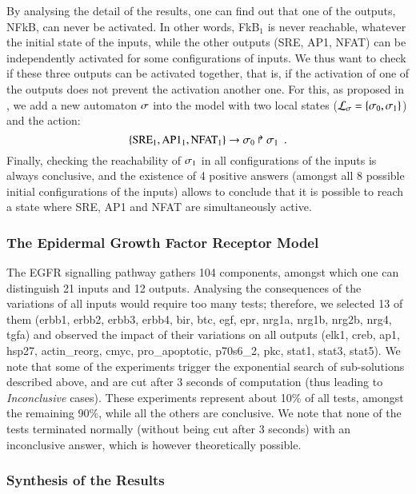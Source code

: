 By analysing the detail of the results, one can find out that one of the outputs, NFkB, can never be activated.
In other words, FkB$_1$ is never reachable, whatever the initial state of the inputs,
while the other outputs (SRE, AP1, NFAT) can be independently activated
for some configurations of inputs.
We thus want to check if these three outputs can be activated together,
that is, if the activation of one of the outputs does not prevent the activation another one.
For this, as proposed in ,
we add a new automaton $\sigma$ into the model
with two local states ($\mathcal{L}_\sigma = \{ \sigma_0, \sigma_1 \}$)
and the action:
\[ \{\text{SRE}_1, \text{AP1}_1, \text{NFAT}_1\}\rightarrow\sigma_0\Rsh\sigma_1 \enspace. \]
Finally, checking the reachability of $\sigma_1$ in all configurations of the inputs
is always conclusive,
and the existence of 4 positive answers
(amongst all 8 possible initial configurations of the inputs) allows to conclude that
it is possible to reach a state where SRE, AP1 and NFAT are simultaneously active.

\subsubsection*{The Epidermal Growth Factor Receptor Model}

The EGFR signalling pathway gathers 104 components, amongst which one can distinguish
21 inputs and 12 outputs.
Analysing the consequences of the variations of all inputs
would require too many tests;
therefore, we selected 13 of them
(erbb1, erbb2, erbb3, erbb4, bir, btc, egf, epr, nrg1a, nrg1b, nrg2b, nrg4, tgfa)
and observed the impact of their variations on all outputs
(elk1, creb, ap1, hsp27, actin\_reorg, cmyc, pro\_apoptotic, p70s6\_2, pkc, stat1, stat3, stat5).
We note that some of the experiments trigger the exponential search
of sub-solutions described above, and are cut after 3 seconds of computation
(thus leading to \emph{Inconclusive} cases).
These experiments represent about 10\% of all tests,
amongst the remaining 90\%, while all the others are conclusive.
We note that none of the tests terminated normally (without being cut after 3 seconds)
with an inconclusive answer, which is however theoretically possible.

\subsubsection*{Synthesis of the Results}

